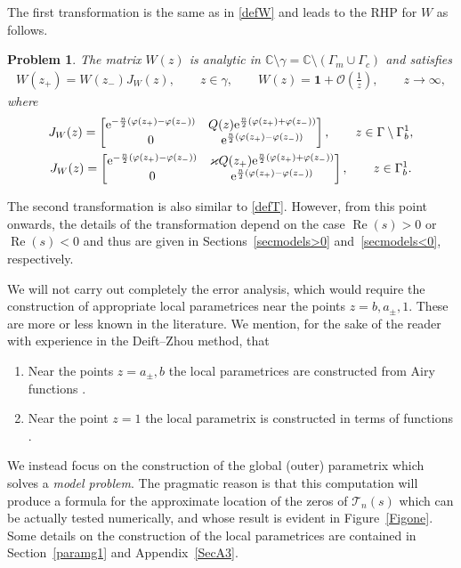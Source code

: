 \documentclass[10pt,a4paper]{amsart}
\numberwithin{equation}{section}
\newtheorem{problem}[Theorem]{Problem}
\theoremstyle{definition}
\def\le{\left}
\def\ri{\right}
\def \1{\mathbf 1}
\def\C{{\mathbb C}}
\def \Re{\operatorname{Re} }
\begin{document}
The first transformation is the same as in \eqref{defW} and leads to the RHP for $W$ as follows.
\begin{problem}
\label{RHPWs>0}The matrix $W(z)$ is analytic in $\C \setminus \gamma = \C\setminus (\Gamma_m\cup \Gamma_c)$ and satisfies
\begin{gather*}
W(z_+)= W(z_-) J_W(z), \qquad z\in \gamma,\qquad
W(z) = \1 + \mathcal O\le(\frac 1 z \ri), \qquad z\to \infty,
\end{gather*}
where
\begin{gather*}
J_W(z)
=\begin{bmatrix}
{\rm e}^{-\frac n2\le( \varphi(z_+)-\varphi(z_-)\ri) } & Q(z) {\rm e}^{ \frac n2 \le(\varphi(z_+)+\varphi(z_-)\ri)}\\
0 & {\rm e}^{\frac n2 \le(\varphi(z_+)-\varphi(z_-) \ri)}
\end{bmatrix},\qquad z\in \Gamma\setminus \Gamma_{b}^1,
\\
J_W(z)
=\begin{bmatrix}
{\rm e}^{-\frac n2\le( \varphi(z_+)-\varphi(z_-)\ri) } & \varkappa Q(z_+) {\rm e}^{ \frac n2 \le(\varphi(z_+)+\varphi(z_-)\ri)}\\
0 & {\rm e}^{\frac n2 \le(\varphi(z_+)-\varphi(z_-) \ri)}
\end{bmatrix},\qquad z\in \Gamma_{b}^1.
\end{gather*}
\end{problem}
The second transformation is also similar to \eqref{defT}. However, from this point onwards, the details of the transformation depend on the case $\Re(s)>0$ or $\Re(s)<0$ and thus are given in Sections~\ref{secmodels>0} and~\ref{secmodels<0}, respectively.

We will not carry out completely the error analysis, which would require the construction of appropriate local parametrices near the points $z= b, a_\pm, 1$. These are more or less known in the literature. We mention, for the sake of the reader with experience in the Deift--Zhou method, that
\begin{enumerate}\itemsep=0pt
\item[(1)] Near the points $z= a_\pm, b$ the local parametrices are constructed from Airy functions \cite{BertolaBothner,DKMVZ}.
\item[(2)] Near the point $z=1$ the local parametrix is constructed in terms of functions \cite{VanlessenStrong}.
\end{enumerate}
We instead focus on the construction of the global (outer) parametrix which solves a {\it model problem}. The pragmatic reason is that this computation will produce a formula for the approximate location of the zeros of $\mathcal T_n(s)$ which can be actually tested numerically, and whose result is evident in Figure~\ref{Figone}.
Some details on the construction of the local parametrices are contained in Section~\ref{paramg1} and Appendix~\ref{SecA3}.
\end{document}

